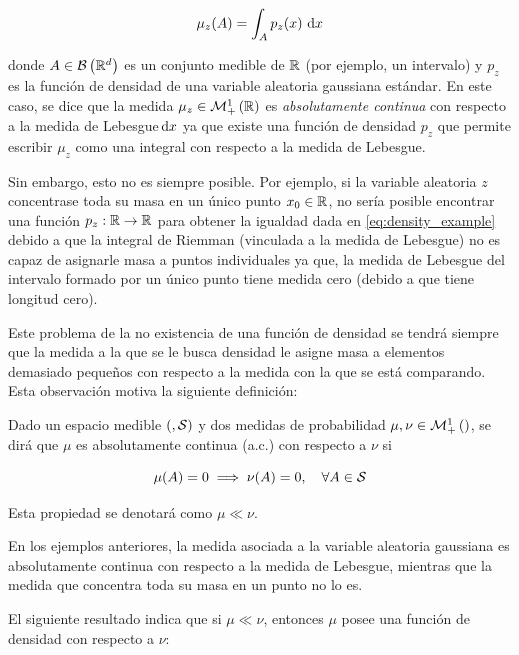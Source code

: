 \begin{equation}
	\label{eq:density_example}
	\mu_z(A) = \int_A p_z(x) \,\operatorname{d}\! x
\end{equation}

donde $A\in\mathcal{B}\left(\mathbb{R}^d\right)$ es un conjunto medible de $\mathbb{R}$ (por ejemplo, un intervalo) y $p_z$ es la función de densidad de una variable aleatoria gaussiana estándar. En este caso, se dice que la medida $\mu_z\in\mathcal{M}_+^1\left(\mathbb{R}\right)$ es \textit{absolutamente continua} con respecto a la medida de Lebesgue$\,\operatorname{d}\! x$ ya que existe una función de densidad $p_z$ que permite escribir $\mu_z$ como una integral con respecto a la medida de Lebesgue.

Sin embargo, esto no es siempre posible. Por ejemplo, si la variable aleatoria $z$ concentrase toda su masa en un único punto $x_0\in\mathbb{R}$, no sería posible encontrar una función $p_z:\mathbb{R}\to\mathbb{R}$ para obtener la igualdad dada en \eqref{eq:density_example} debido a que la integral de Riemman (vinculada a la medida de Lebesgue) no es capaz de asignarle masa a puntos individuales ya que, la medida de Lebesgue del intervalo formado por un único punto tiene medida cero (debido a que tiene longitud cero).

Este problema de la no existencia de una función de densidad se tendrá siempre que la medida a la que se le busca densidad le asigne masa a elementos demasiado pequeños con respecto a la medida con la que se está comparando. Esta observación motiva la siguiente definición:

\begin{defn}
    \label{defn:absolute_continuity_measures}
    Dado un espacio medible $(,\mathcal{S})$ y dos medidas de probabilidad $\mu,\nu\in\mathcal{M}_+^1\left(\right)$, se dirá que $\mu$ es absolutamente continua (a.c.) con respecto a $\nu$ si

    \begin{equation}
        \mu(A) = 0 \implies \nu(A)=0,\quad \forall A\in\mathcal{S}
    \end{equation}

    Esta propiedad se denotará como $\mu\ll\nu$.
\end{defn}

En los ejemplos anteriores, la medida asociada a la variable aleatoria gaussiana es absolutamente continua con respecto a la medida de Lebesgue, mientras que la medida que concentra toda su masa en un punto no lo es.

El siguiente resultado indica que si $\mu\ll\nu$, entonces $\mu$ posee una función de densidad con respecto a $\nu$:

